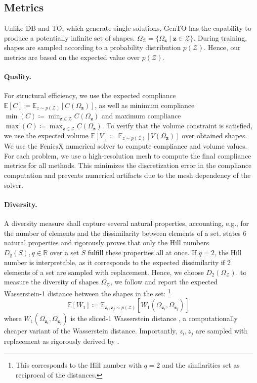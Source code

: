 \subsection{Metrics}

Unlike DB and TO, which generate single solutions, GenTO has the capability to produce a potentially infinite set of shapes. $\Omega_\mathcal{Z} = \{ \Omega_\mathbf{z} \mid \mathbf{z} \in \mathcal{Z} \}$.
During training, shapes are sampled according to a probability distribution $p(\mathcal{Z})$.
Hence, our metrics are based on the expected value over $p(\mathcal{Z})$.

\paragraph{Quality.}
For structural efficiency, we use the expected compliance $\mathbb{E}[C] \coloneqq \mathbb{E}_{z \sim p(\mathcal{Z})}[C(\Omega_\mathbf{z})]$, as well as minimum compliance $\min(C) \coloneqq \min_{\mathbf{z} \in \mathcal{Z}}C(\Omega_\mathbf{z})$ and maximum compliance $\max(C) \coloneqq \max_{\mathbf{z} \in \mathcal{Z}}C(\Omega_\mathbf{z})$. 
To verify that the volume constraint is satisfied, we use the expected volume $\mathbb{E}[V]\coloneqq \mathbb{E}_{z \sim p(\mathcal{Z})}[V(\Omega_\mathbf{z})]$ over obtained shapes. %
We use the FenicsX numerical solver \citep{baratta2023dolfinx} to compute compliance and volume values.
For each problem, we use a high-resolution mesh to compute the final compliance metrics for all methods. This minimizes the discretization error in the compliance computation and prevents numerical artifacts due to the mesh dependency of the solver. 

\paragraph{Diversity.}
A diversity measure shall capture several natural properties, accounting, e.g., for the number of elements and the dissimilarity between elements of a set.
\citet{leinster2024entropy} states 6 natural properties and rigorously proves that only the Hill numbers $D_q(S), q \in \mathbb{R}$ over a set $S$ fulfill these properties all at once.
If $q=2$, the Hill number is interpretable, as it corresponds to the expected dissimilarity if 2 elements of a set are sampled with replacement. 
Hence, we choose $D_2(\Omega_\mathcal{Z})$.
to measure the diversity of shapes $\Omega_\mathcal{Z}$, we follow \citet{leinster2024entropy} and report the expected Wasserstein-1 distance between the shapes in the set:
\footnote{This corresponds to the Hill number with $q=2$ and the similarities set as reciprocal of the distances.} 
\begin{equation}
    \mathbb{E}[W_1] \coloneqq \mathbb{E}_{\mathbf{z}_i, \mathbf{z}_j \sim p(\mathcal{Z})} \left[ W_1(\Omega_{\mathbf{z}_i}, \Omega_{\mathbf{z}_j}) \right]
\end{equation}
where $W_1(\Omega_{\mathbf{z}_i}, \Omega_{\mathbf{z}_j})$ is the sliced-1 Wasserstein distance \citep{flamary2021pot}, a computationally cheaper variant of the Wasserstein distance.
Importantly, $z_i, z_j$ are sampled with replacement as rigorously derived by \citet{leinster2024entropy}.

